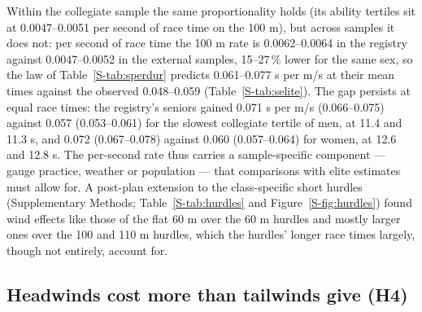 \documentclass[12pt,a4paper]{article}
\begin{document}
Within the collegiate sample the same proportionality holds (its ability tertiles sit at 0.0047--0.0051 per second of race time on the 100 m), but across samples it does not: per second of race time the 100 m rate is 0.0062--0.0064 in the registry against 0.0047--0.0052 in the external samples, 15--27\,\% lower for the same sex, so the law of Table~\ref{S-tab:sperdur} predicts 0.061--0.077 s per m/s at their mean times against the observed 0.048--0.059 (Table~\ref{S-tab:selite}). The gap persists at equal race times: the registry's seniors gained 0.071 s per m/s (0.066--0.075) against 0.057 (0.053--0.061) for the slowest collegiate tertile of men, at 11.4 and 11.3 s, and 0.072 (0.067--0.078) against 0.060 (0.057--0.064) for women, at 12.6 and 12.8 s. The per-second rate thus carries a sample-specific component --- gauge practice, weather or population --- that comparisons with elite estimates must allow for. A post-plan extension to the class-specific short hurdles (Supplementary Methods; Table~\ref{S-tab:hurdles} and Figure~\ref{S-fig:hurdles}) found wind effects like those of the flat 60 m over the 60 m hurdles and mostly larger ones over the 100 and 110 m hurdles, which the hurdles' longer race times largely, though not entirely, account for.

\subsection{Headwinds cost more than tailwinds give (H4)}
\end{document}
